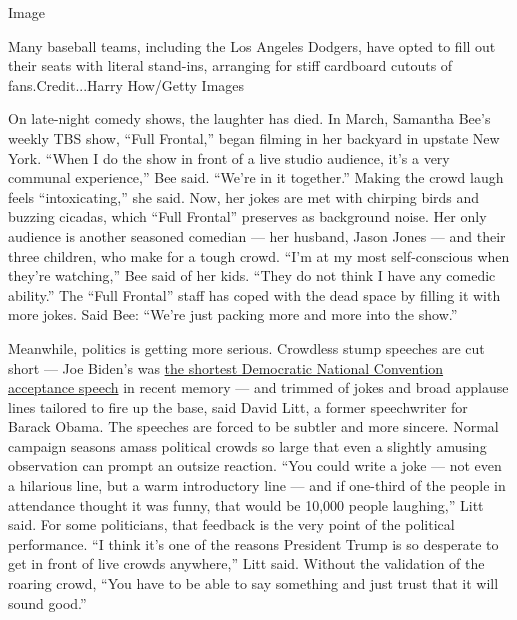 Image

Many baseball teams, including the Los Angeles Dodgers, have opted to
fill out their seats with literal stand-ins, arranging for stiff
cardboard cutouts of fans.Credit...Harry How/Getty Images

On late-night comedy shows, the laughter has died. In March, Samantha
Bee's weekly TBS show, ``Full Frontal,'' began filming in her backyard
in upstate New York. ``When I do the show in front of a live studio
audience, it's a very communal experience,'' Bee said. ``We're in it
together.'' Making the crowd laugh feels ``intoxicating,'' she said.
Now, her jokes are met with chirping birds and buzzing cicadas, which
``Full Frontal'' preserves as background noise. Her only audience is
another seasoned comedian --- her husband, Jason Jones --- and their
three children, who make for a tough crowd. ``I'm at my most
self-conscious when they're watching,'' Bee said of her kids. ``They do
not think I have any comedic ability.'' The ``Full Frontal'' staff has
coped with the dead space by filling it with more jokes. Said Bee:
``We're just packing more and more into the show.''

Meanwhile, politics is getting more serious. Crowdless stump speeches
are cut short --- Joe Biden's was
\href{https://tennesseestar.com/2020/08/22/joe-biden-gives-shortest-dnc-acceptance-speech-in-decades/}{the
shortest Democratic National Convention acceptance speech} in recent
memory --- and trimmed of jokes and broad applause lines tailored to
fire up the base, said David Litt, a former speechwriter for Barack
Obama. The speeches are forced to be subtler and more sincere. Normal
campaign seasons amass political crowds so large that even a slightly
amusing observation can prompt an outsize reaction. ``You could write a
joke --- not even a hilarious line, but a warm introductory line --- and
if one-third of the people in attendance thought it was funny, that
would be 10,000 people laughing,'' Litt said. For some politicians, that
feedback is the very point of the political performance. ``I think it's
one of the reasons President Trump is so desperate to get in front of
live crowds anywhere,'' Litt said. Without the validation of the roaring
crowd, ``You have to be able to say something and just trust that it
will sound good.''

